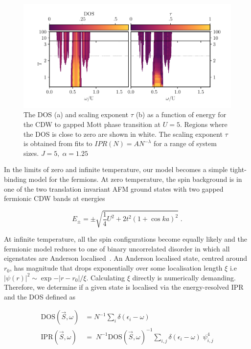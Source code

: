 \hypertarget{fig:gap_opening_U5}{%
\begin{figure}
\centering
\includegraphics[width=1\textwidth,height=\textheight]{figure_code/fk_chapter/gap_opening/gap_opening_U5}
\caption[{The transition from CDW to the Mott phase}]{The DOS (a) and scaling exponent \(\tau\) (b) as a function of energy for the CDW to gapped Mott phase transition at \(U=5\). Regions where the DOS is close to zero are shown in white. The scaling exponent \(\tau\) is obtained from fits to \(IPR(N) = A N^{-\lambda}\) for a range of system sizes. \(J = 5,\;\alpha = 1.25\)}
\label{fig:gap_opening_U5}
\end{figure}
}

In the limits of zero and infinite temperature, our model becomes a simple tight-binding model for the fermions. At zero temperature, the spin background is in one of the two translation invariant AFM ground states with two gapped fermionic CDW bands at energies

\[E_{\pm} = \pm\sqrt{\frac{1}{4}U^2 + 2t^2(1 + \cos ka)^2}\;.\]

At infinite temperature, all the spin configurations become equally likely and the fermionic model reduces to one of binary uncorrelated disorder in which all eigenstates are Anderson localised~\autocite{abrahamsScalingTheoryLocalization1979}. An Anderson localised state, centred around \(r_0\), has magnitude that drops exponentially over some localisation length \(\xi\) i.e \(|\psi(r)|^2 \sim \exp{-|r - r_0|/\xi}\). Calculating \(\xi\) directly is numerically demanding. Therefore, we determine if a given state is localised via the energy-resolved IPR and the DOS defined as

\[\begin{aligned}
\mathrm{DOS}(\vec{S}, \omega)& = N^{-1} \sum_{i} \delta(\epsilon_i - \omega)\\
\mathrm{IPR}(\vec{S}, \omega)& = \; N^{-1} \mathrm{DOS}(\vec{S}, \omega)^{-1} \sum_{i,j} \delta(\epsilon_i - \omega)\;\psi^{4}_{i,j}\end{aligned}\]

